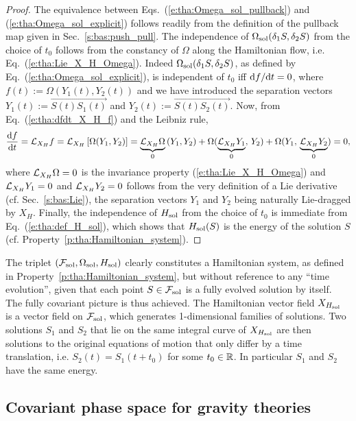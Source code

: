 \begin{proof}
The equivalence between Eqs.~(\ref{e:tha:Omega_sol_pullback}) and (\ref{e:tha:Omega_sol_explicit}) follows readily from the definition of the pullback
map given in Sec.~\ref{s:bas:push_pull}. The independence
of $\Omega_{\rm sol}(\delta_1 S, \delta_2 S)$ from the choice of $t_0$
follows from the constancy of $\Omega$ along the Hamiltonian flow, i.e.
Eq.~(\ref{e:tha:Lie_X_H_Omega}). Indeed $\Omega_{\rm sol}(\delta_1 S, \delta_2 S)$,
as defined by Eq.~(\ref{e:tha:Omega_sol_explicit}), is independent of $t_0$
iff $\mathrm{d} f / \mathrm{d} t = 0$, where
$f(t) := \Omega (Y_1(t), Y_2(t))$
and we have introduced the separation vectors $Y_1(t) := \overrightarrow{S(t)S_1(t)}$ and $Y_2(t) := \overrightarrow{S(t)S_2(t)}$. Now, from Eq.~(\ref{e:tha:dfdt_X_H_f})
and the Leibniz rule,
\[
    \frac{\mathrm{d} f}{\mathrm{d} t} = \mathcal{L}_{X_H} f
    = \mathcal{L}_{X_H} \left[ \Omega (Y_1, Y_2) \right]
    = \underbrace{\mathcal{L}_{X_H} \Omega}_{0} \,  (Y_1, Y_2)
        + \Omega( \underbrace{\mathcal{L}_{X_H} Y_1}_{0}, \, Y_2 )
        + \Omega(  Y_1,\,  \underbrace{\mathcal{L}_{X_H} Y_2}_{0} )
    = 0,
\]
where $\mathcal{L}_{X_H} \Omega = 0$ is the invariance property (\ref{e:tha:Lie_X_H_Omega})
and $\mathcal{L}_{X_H} Y_1 = 0$ and $\mathcal{L}_{X_H} Y_2 = 0$ follows from the very definition
of a Lie derivative (cf. Sec.~\ref{s:bas:Lie}),
the separation vectors $Y_1$ and $Y_2$ being naturally Lie-dragged by $X_H$.
Finally, the independence of $H_{\rm sol}$ from the choice of $t_0$
is immediate from Eq.~(\ref{e:tha:def_H_sol}), which shows that
$H_{\rm sol}(S)$ is the energy of the solution $S$
(cf. Property~\ref{p:tha:Hamiltonian_system}).
\end{proof}

The triplet $(\mathcal{F}_{\rm sol}, \Omega_{\rm sol}, H_{\rm sol})$ clearly constitutes
a Hamiltonian system, as defined in Property~\ref{p:tha:Hamiltonian_system}, but
without reference to any ``time evolution'', given that each point $S\in\mathcal{F}_{\rm sol}$
is a fully evolved solution by itself. The fully covariant picture is thus achieved.
The Hamiltonian vector field $X_{H_{\rm sol}}$ is a vector field on $\mathcal{F}_{\rm sol}$,
which generates 1-dimensional families of solutions. Two solutions $S_1$ and $S_2$
that lie on the same integral curve of $X_{H_{\rm sol}}$ are then
solutions to the original equations of motion that only differ by a time translation,
i.e. $S_2(t) = S_1(t + t_0)$ for some $t_0\in\mathbb{R}$. In particular $S_1$ and $S_2$
have the same energy.



\subsection{Covariant phase space for gravity theories} \label{s:tha:cps_gravity}

